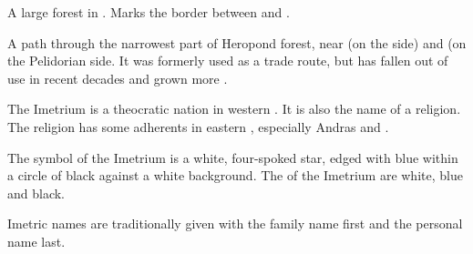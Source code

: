 \begin{gloss}
\begin{comment}
\paragraph{Heropond Forest}
\end{comment}
A large \Wylde{} forest in . 
Marks the border between  and . 





\begin{subgloss}
  \begin{comment}
  \subparagraph{Leglan's Pass}
  \end{comment}
  A path through the narrowest part of Heropond forest, near  (on the  side) and  (on the Pelidorian side. 
  It was formerly used as a trade route, but has fallen out of use in recent decades and grown more . 
\end{subgloss}














\begin{comment}
\paragraph{The Imetrium}
\end{comment}
The Imetrium is a theocratic nation in western . 
It is also the name of a religion. 
The religion has some adherents in eastern , especially {Andras} and . 

The symbol of the Imetrium is a white, four-spoked star, edged with blue within a circle of black against a white background. 
The \colours of the Imetrium are white, blue and black. 

Imetric names are traditionally given with the family name first and the personal name last. 






\end{gloss}
